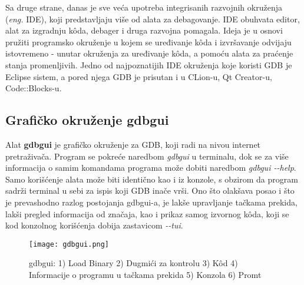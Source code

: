 \documentclass[a4paper]{article}
\begin{document}
Sa druge strane, danas je sve veća upotreba integrisanih razvojnih okruženja (\textit{eng.} IDE),
koji predstavljaju više od alata za debagovanje. IDE obuhvata editor, alat za izgradnju k\^{o}da, debager i druga 
razvojna pomagala. Ideja je u osnovi pružiti programsko okruženje u kojem se uređivanje k\^{o}da i izvršavanje
odvijaju istovremeno - unutar okruženja za uređivanje k\^{o}da, a pomoću alata za praćenje stanja promenljivih\cite{computerworld}.
Jedno od najpoznatijih IDE okruženja koje koristi GDB je Eclipse sistem,
a pored njega GDB je prisutan i u CLion-u, Qt Creator-u, Code::Blocks-u\cite{sourceware}.

\subsection{Grafičko okruženje gdbgui}
\label{subsec:gdbgui}

Alat \textbf{gdbgui} je grafičko okruženje za GDB, koji radi na nivou internet pretraživača.
Program se pokreće naredbom \textit{gdbgui} u terminalu, dok se za više informacija o samim komandama
programa može dobiti naredbom \textit{gdbgui -\phantom{}-help}\cite{gdbgui}. Samo korišćenje alata može biti
identično kao i iz konzole, s obzirom da program sadrži terminal u sebi za ispis koji GDB inače vrši. Ono 
što olakšava posao i što je prevashodno razlog postojanja gdbgui-a, je lakše upravljanje tačkama prekida,
lakši pregled informacija od značaja, kao i prikaz samog izvornog k\^{o}da, koji se kod konzolnog korišćenja 
dobija zastavicom \textit{-\phantom{}-tui}.

\begin{figure}[h!]
\begin{center}
\texttt{[image: gdbgui.png]}
\end{center}
\caption{gdbgui: 1) Load Binary 2) Dugmići za kontrolu 3) K\^{o}d 4) Informacije o programu u tačkama prekida 5) Konzola 6) Promt}
\label{fig:gdbgui}
\end{figure}
\end{document}
